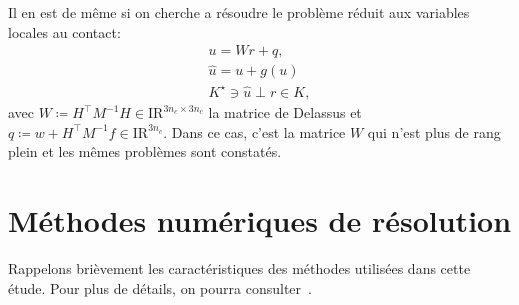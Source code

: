 \documentclass{CSMA2017}
\def\RR{\nbR}
\def\nbR{\ensuremath{\mathrm{I\!R}}} %
\begin{document}
Il en est de même si on cherche a résoudre le problème réduit aux variables locales au contact:
\begin{equation}\label{eq:soccp2-intro}
  \begin{array}{l}
    u = W r + q,  \\
    \hat u = u + g(u) \\
        K^\star \ni {\hat u} \perp r \in K,
  \end{array}
\end{equation}
avec $W \coloneqq H^\top M^{-1} H \in \RR^{3n_c\times 3n_c}$ la matrice de Delassus et $q \coloneqq w + H^\top M^{-1} f \in \RR^{3n_c}$. Dans ce cas, c'est la matrice $W$ qui n'est plus de rang plein et les mêmes problèmes sont constatés.


\section{Méthodes numériques de résolution}
Rappelons brièvement les caractéristiques des méthodes utilisées dans cette étude. Pour plus de détails, on pourra consulter~\cite{Acary.Brogliato2008}.
\end{document}
